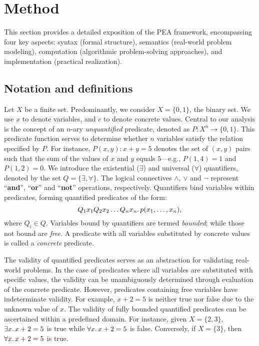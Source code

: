 \section{Method}
\label{Se:Method}

This section provides a detailed exposition of the PEA framework, encompassing four key aspects: syntax (formal structure), semantics (real-world problem modeling), computation (algorithmic problem-solving approaches), and implementation (practical realization). %

\subsection{Notation and definitions}\label{sec:def}
Let $X$ be a finite set. Predominantly, we consider $X=\{0,1\}$, the binary set. We use $x$ to denote variables, and $c$ to denote concrete values. Central to our analysis is the concept of an $n$-ary \emph{unquantified} predicate, denoted as $P: X^n\rightarrow \{0, 1\}$. This predicate function serves to determine whether $n$ variables satisfy the relation specified by $P$. For instance, $P(x, y): x+y = 5$ denotes
the set of $(x,y)$ pairs such that the sum of the values of $x$ and $y$ equals $5$---e.g.,
$P(1, 4)=1$ and $P(1,2) = 0$. We introduce the existential ($\exists$) and universal ($\forall$) quantifiers, denoted by the set $Q=\{\exists, \forall\}$. The logical connectives $\land$, $\lor$ and $\neg$ represent ``\textbf{and}'', ``\textbf{or}'' and ``\textbf{not}'' operations, respectively. Quantifiers 
bind
variables within predicates, forming quantified predicates of the form:
\begin{equation}\label{eq:qp}
    Q_1 x_1 Q_2 x_2\ldots Q_n x_n \ldotp p(x_1, \ldots, x_n),
\end{equation}
where $Q_i\in Q$. Variables bound by quantifiers are termed \emph{bounded}; while those not bound are \emph{free}. A predicate with all variables substituted by concrete values is called a \emph{concrete} predicate.

The validity of quantified predicates serves as an abstraction for validating real-world problems. In the case of predicates where all variables are substituted with specific values, the validity can be unambiguously determined through evaluation of the concrete predicate. However, predicates containing free variables have indeterminate validity. For example, $x + 2 = 5$ is neither true nor false due to the unknown value of $x$. The validity of fully bounded quantified predicates can be ascertained within a predefined domain. For instance, given $X = \{2,3\}$, $\exists x\ldotp x+2=5$ is true while $\forall x\ldotp x+2=5$ is false. Conversely, if $X=\{3\}$, then $\forall x\ldotp x+2=5$ is true.


